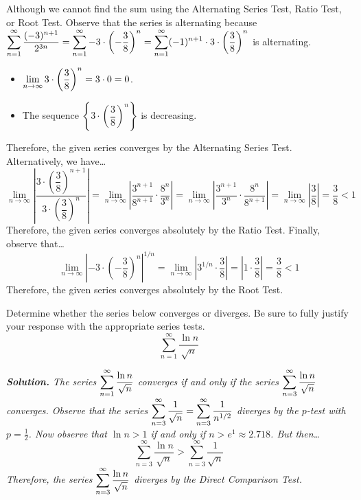 \documentclass[12pt,letterpaper]{exam}
\begin{document}
\begin{questions}
{Although we cannot find the sum using the Alternating Series Test, Ratio Test, or Root Test. Observe that the series is alternating because $\displaystyle\sum_{n=1}^\infty \dfrac{(-3)^{n + 1}}{2^{3n}}= \sum_{n=1}^\infty -3 \cdot \left( -\dfrac{3}{8} \right)^n= \sum_{n=1}^\infty (-1)^{n + 1} \cdot 3 \cdot \left( \dfrac{3}{8} \right)^n$ is alternating. 
	\begin{itemize}
	\item $\displaystyle\lim_{n \to \infty} 3 \cdot \left( \dfrac{3}{8} \right)^n= 3 \cdot 0= 0$.
	\item The sequence $\left\{ 3 \cdot \left( \dfrac{3}{8} \right)^n \right\}$ is decreasing.
	\end{itemize}
Therefore, the given series converges by the Alternating Series Test. Alternatively, we have\dots
	\[
	\lim_{n \to \infty} \left| \dfrac{3 \cdot \left( \dfrac{3}{8} \right)^{n + 1}}{3 \cdot \left( \dfrac{3}{8} \right)^n} \right|= \lim_{n \to \infty} \left| \dfrac{3^{n + 1}}{8^{n + 1}} \cdot \dfrac{8^n}{3^n} \right|= \lim_{n \to \infty} \left| \dfrac{3^{n + 1}}{3^n} \cdot \dfrac{8^n}{8^{n + 1}} \right|= \lim_{n \to \infty} \left| \dfrac{3}{8} \right|= \dfrac{3}{8} < 1
	\]
Therefore, the given series converges absolutely by the Ratio Test. Finally, observe that\dots
	\[
	\lim_{n \to \infty} \left| -3 \cdot \left( -\dfrac{3}{8} \right)^n \right|^{1/n}= \lim_{n \to \infty} \left| 3^{1/n} \cdot \dfrac{3}{8} \right|= \left| 1 \cdot \dfrac{3}{8} \right|= \dfrac{3}{8} < 1
	\]
Therefore, the given series converges absolutely by the Root Test. 
}



\newpage
\question[10] Determine whether the series below converges or diverges. Be sure to fully justify your response with the appropriate series tests.
	\[
	\sum_{n=1}^\infty \dfrac{\ln n}{\sqrt{n}}
	\] \pspace

{\footnotesize\itshape \textbf{Solution.} The series $\displaystyle\sum_{n=1}^\infty \dfrac{\ln n}{\sqrt{n}}$ converges if and only if the series $\displaystyle\sum_{n=3}^\infty \dfrac{\ln n}{\sqrt{n}}$ converges. Observe that the series $\displaystyle\sum_{n=3}^\infty \dfrac{1}{\sqrt{n}}= \sum_{n=3}^\infty \dfrac{1}{n^{1/2}}$ diverges by the $p$-test with $p= \frac{1}{2}$. Now observe that $\ln n > 1$ if and only if $n > e^1 \approx 2.718$. But then\dots
	\[
	\sum_{n=3}^\infty \dfrac{\ln n}{\sqrt{n}} > \sum_{n=3}^\infty \dfrac{1}{\sqrt{n}}
	\]
Therefore, the series $\displaystyle\sum_{n=3}^\infty \dfrac{\ln n}{\sqrt{n}}$ diverges by the Direct Comparison Test. \pspace

}
\end{questions}
\end{document}
